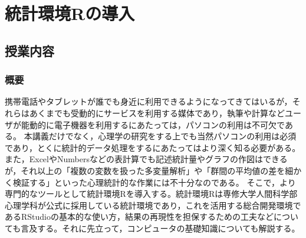 \section{統計環境Rの導入}
\label{b03_introR}
\subsection{授業内容}
\subsubsection{概要}
携帯電話やタブレットが誰でも身近に利用できるようになってきてはいるが，それらはあくまでも受動的にサービスを利用する媒体であり，執筆や計算などユーザが能動的に電子機器を利用するにあたっては，パソコンの利用は不可欠である。
本講義だけでなく，心理学の研究をする上でも当然パソコンの利用は必須であり，とくに統計的データ処理をするにあたってはより深く知る必要がある。また，ExcelやNumbersなどの表計算でも記述統計量やグラフの作図はできるが，それ以上の「複数の変数を扱った多変量解析」や「群間の平均値の差を細かく検証する」といった心理統計的な作業には不十分なのである。
そこで，より専門的なツールとして統計環境Rを導入する。統計環境Rは専修大学人間科学部心理学科が公式に採用している統計環境であり，これを活用する総合開発環境であるRStudioの基本的な使い方，結果の再現性を担保するための工夫などについても言及する。それに先立って，コンピュータの基礎知識についても解説する。
